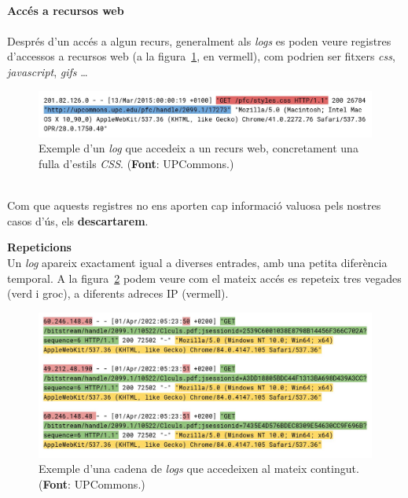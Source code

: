 \noindent \\
\textbf{Accés a recursos web} \\ \\
Després d’un accés a algun recurs, generalment als \textit{\gls{log}s} es poden veure registres d’accessos a recursos web (a la figura~\ref{fig:log-web-resource}, en vermell),
com podrien ser fitxers \textit{css}, \textit{javascript}, \textit{gifs} \dots

\begin{figure}[htbp]
    \centerline{\includegraphics[width=\textwidth]{figures/log-web-resource}}
    \captionsetup{justification=centering}
    \caption[Exemple d'un \textit{\gls{log}} que accedeix a un recurs web, concretament una fulla d'estils \textit{\gls{CSS}}.]{Exemple d'un \textit{\gls{log}} que accedeix a un recurs web, concretament una fulla d'estils \textit{\gls{CSS}}. (\textbf{Font}: \gls{UPCommons}.)}\label{fig:log-web-resource}
\end{figure}

\noindent \\
Com que aquests registres no ens aporten cap informació valuosa pels nostres casos d'ús, els \textbf{descartarem}.

\clearpage

\noindent
\textbf{Repeticions} \\

\noindent
Un \textit{\gls{log}} apareix exactament igual a diverses entrades, amb una petita diferència temporal.
A la figura~\ref{fig:log-repetitions} podem veure com el mateix accés es repeteix tres vegades (verd i groc), a diferents adreces \gls{IP} (vermell).

\begin{figure}[htbp]
    \centerline{\includegraphics[width=\textwidth]{figures/log-repetitions}}
    \captionsetup{justification=centering}
    \caption[Exemple d'una cadena de \textit{\gls{log}s} que accedeixen al mateix contingut.]{Exemple d'una cadena de \textit{\gls{log}s} que accedeixen al mateix contingut. (\textbf{Font}: \gls{UPCommons}.)}\label{fig:log-repetitions}
\end{figure}


